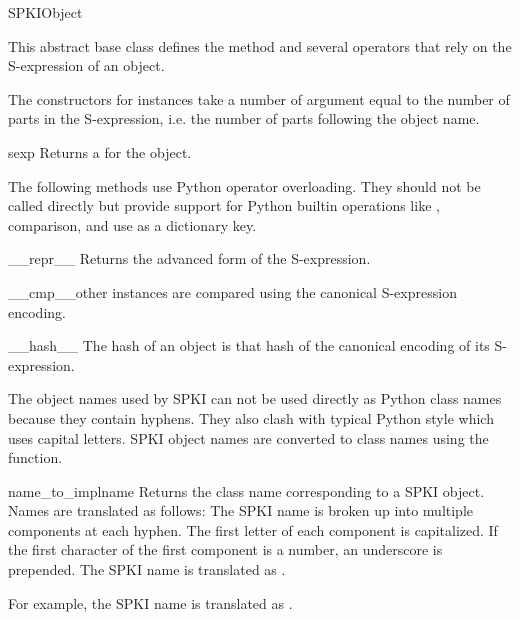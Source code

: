 \documentclass{howto}
\begin{document}
\begin{classdesc}{SPKIObject}{}

This abstract base class defines the  method and several
operators that rely on the S-expression of an object.

The constructors for  instances take a number of
argument equal to the number of parts in the S-expression, i.e. the
number of parts following the object name.

\begin{methoddesc}{sexp}{}
Returns a  for the object.
\end{methoddesc}

The following methods use Python operator overloading.  They should
not be called directly but provide support for Python builtin
operations like , comparison, and use as a dictionary
key. 

\begin{methoddesc}{__repr__}{}
Returns the advanced form of the S-expression.
\end{methoddesc}

\begin{methoddesc}{__cmp__}{other}
 instances are compared using the canonical
S-expression encoding.
\end{methoddesc}

\begin{methoddesc}{__hash__}{}
The hash of an object is that hash of the canonical encoding of its
S-expression. 
\end{methoddesc}

\end{classdesc}

The object names used by SPKI can not be used directly as Python class
names because they contain hyphens.  They also clash with typical
Python style which uses capital letters.  SPKI object names are
converted to class names using the  function.

\begin{funcdesc}{name_to_impl}{name}
Returns the class name corresponding to a SPKI object.  Names are
translated as follows: The SPKI name is broken up into multiple
components at each hyphen.  The first letter of each component is
capitalized.  If the first character of the first component is a
number, an underscore is prepended.  The SPKI name \code{*} is
translated as .

For example, the SPKI name  is translated as
.
\end{funcdesc}
\end{document}
